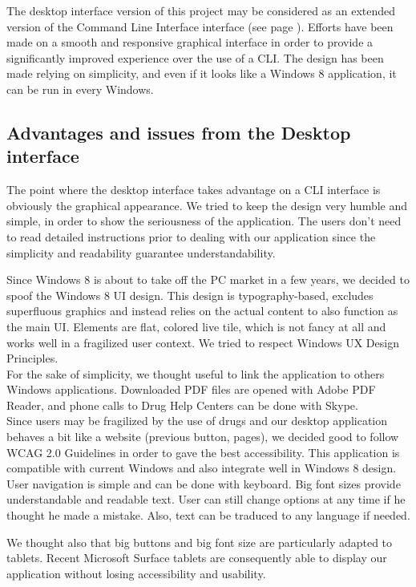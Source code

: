 \documentclass[a4paper,12pt, twocolumn]{article}
\begin{document}
The desktop interface version of this project may be considered as an extended version of the Command Line Interface interface (see page \pageref{cli}). Efforts have been made on a smooth and responsive graphical interface in order to provide a significantly improved experience over the use of a CLI. The design has been made relying on simplicity, and even if it looks like a Windows 8 application, it can be run in every Windows.

\subsection*{Advantages and issues from the Desktop interface}

The point where the desktop interface takes advantage on a CLI interface is obviously the graphical appearance. We tried to keep the design very humble and simple, in order to show the seriousness of the application. The users don't need to read detailed instructions prior to dealing with our application since the simplicity and readability guarantee understandability.

Since Windows 8 is about to take off the PC market in a few years, we decided to spoof the Windows 8 UI design. This design is typography-based, excludes superfluous graphics and instead relies on the actual content to also function as the main UI. Elements are flat, colored live tile, which is not fancy at all and works well in a fragilized user context. We tried to respect Windows UX Design Principles\cite{windowsux}.\\

For the sake of simplicity, we thought useful to link the application to others Windows applications. Downloaded PDF files are opened with Adobe PDF Reader, and phone calls to Drug Help Centers can be done with Skype.\\

Since users may be fragilized by the use of drugs and our desktop application behaves a bit like a website (previous button, pages), we decided good to follow WCAG 2.0 Guidelines in order to gave the best accessibility\cite{wcag}. This application is compatible with current Windows and also integrate well in Windows 8 design. User navigation is simple and can be done with keyboard. Big font sizes provide understandable and readable text. User can still change options at any time if he thought he made a mistake. Also, text can be traduced to any language if needed.

We thought also that big buttons and big font size are particularly adapted to tablets. Recent Microsoft Surface tablets are consequently able to display our application without losing accessibility and usability.\\
\end{document}
